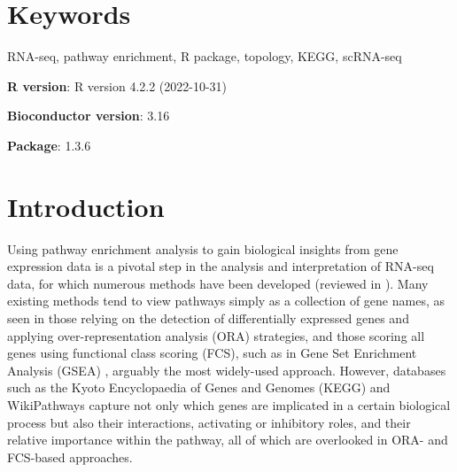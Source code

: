 \documentclass[9pt,a4paper,]{extarticle}
\begin{document}
\section*{Keywords}
RNA-seq, pathway enrichment, R package, topology, KEGG, scRNA-seq


\clearpage
\pagestyle{main}

\textbf{R version}: R version 4.2.2 (2022-10-31)

\textbf{Bioconductor version}: 3.16

\textbf{Package}: 1.3.6

\hypertarget{introduction}{%
\section{Introduction}\label{introduction}}

Using pathway enrichment analysis to gain biological insights from gene expression data is a pivotal step in the analysis and interpretation of RNA-seq data, for which numerous methods have been developed (reviewed in \citep{Maleki2020-ur, Mubeen2022-eq}).
Many existing methods tend to view pathways simply as a collection of gene names, as seen in those relying on the detection of differentially expressed genes and applying over-representation analysis (ORA) strategies, and those scoring all genes using functional class scoring (FCS), such as in Gene Set Enrichment Analysis (GSEA) \citep{Subramanian2005-lx}, arguably the most widely-used approach.
However, databases such as the Kyoto Encyclopaedia of Genes and Genomes (KEGG)\citep{OgataKEGGKyotoEncyclopediaa} and WikiPathways\citep{Martens2021} capture not only which genes are implicated in a certain biological process but also their interactions, activating or inhibitory roles, and their relative importance within the pathway, all of which are overlooked in ORA- and FCS-based approaches.
\end{document}
